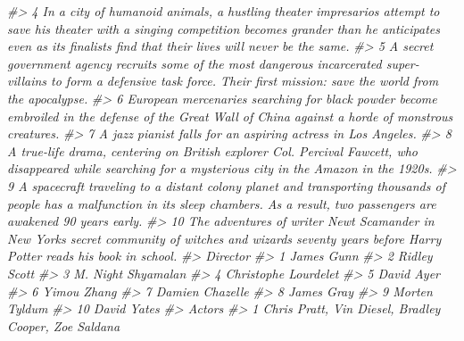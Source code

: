 \documentclass[
]{book}
\newenvironment{Shaded}{\begin{snugshade}}{\end{snugshade}}
\newcommand{\CommentTok}[1]{\textcolor[rgb]{0.56,0.35,0.01}{\textit{#1}}}
\begin{document}
\begin{Shaded}
\begin{Highlighting}[]
\CommentTok{\#\textgreater{} 4  In a city of humanoid animals, a hustling theater impresario\textquotesingle{}s attempt to save his theater with a singing competition becomes grander than he anticipates even as its finalists\textquotesingle{} find that their lives will never be the same.}
\CommentTok{\#\textgreater{} 5                                             A secret government agency recruits some of the most dangerous incarcerated super{-}villains to form a defensive task force. Their first mission: save the world from the apocalypse.}
\CommentTok{\#\textgreater{} 6                                                                              European mercenaries searching for black powder become embroiled in the defense of the Great Wall of China against a horde of monstrous creatures.}
\CommentTok{\#\textgreater{} 7                                                                                                                                                                    A jazz pianist falls for an aspiring actress in Los Angeles.}
\CommentTok{\#\textgreater{} 8                                                                       A true{-}life drama, centering on British explorer Col. Percival Fawcett, who disappeared while searching for a mysterious city in the Amazon in the 1920s.}
\CommentTok{\#\textgreater{} 9                                        A spacecraft traveling to a distant colony planet and transporting thousands of people has a malfunction in its sleep chambers. As a result, two passengers are awakened 90 years early.}
\CommentTok{\#\textgreater{} 10                                                                      The adventures of writer Newt Scamander in New York\textquotesingle{}s secret community of witches and wizards seventy years before Harry Potter reads his book in school.}
\CommentTok{\#\textgreater{}                Director}
\CommentTok{\#\textgreater{} 1            James Gunn}
\CommentTok{\#\textgreater{} 2          Ridley Scott}
\CommentTok{\#\textgreater{} 3    M. Night Shyamalan}
\CommentTok{\#\textgreater{} 4  Christophe Lourdelet}
\CommentTok{\#\textgreater{} 5            David Ayer}
\CommentTok{\#\textgreater{} 6           Yimou Zhang}
\CommentTok{\#\textgreater{} 7       Damien Chazelle}
\CommentTok{\#\textgreater{} 8            James Gray}
\CommentTok{\#\textgreater{} 9         Morten Tyldum}
\CommentTok{\#\textgreater{} 10          David Yates}
\CommentTok{\#\textgreater{}                                                                        Actors}
\CommentTok{\#\textgreater{} 1                        Chris Pratt, Vin Diesel, Bradley Cooper, Zoe Saldana}

\end{Highlighting}
\end{Shaded}
\end{document}
